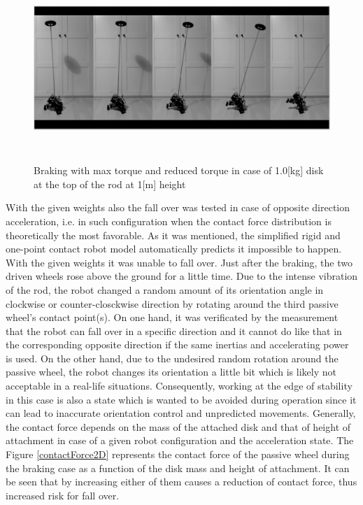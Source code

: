 \documentclass[12pt,english]{article}
\begin{document}
\begin{figure}[htb!]
	\centering
	\includegraphics[height=7cm]{figures/fallover_video_1kg.png}
	\caption{Braking with max torque and reduced torque in case of 1.0[kg] disk at the top of the rod at 1[m] height}
	\label{fallover_video_1kg}
\end{figure}
With the given weights also the fall over was tested in case of opposite direction acceleration, i.e. in such configuration when the contact force distribution is theoretically the most favorable. As it was mentioned, the simplified rigid and one-point contact robot model automatically predicts it impossible to happen. With the given weights it was unable to fall over. Just after the braking, the two driven wheels rose above the ground for a little time. Due to the intense vibration of the rod, the robot changed a random amount of its orientation angle in clockwise or counter-closckwise direction by rotating around the third passive wheel's contact point(s). On one hand, it was verificated by the measurement that the robot can fall over in a specific direction and it cannot do like that in the corresponding opposite direction if the same inertias and accelerating power is used. On the other hand, due to the undesired random rotation around the passive wheel, the robot changes its orientation a little bit which is likely not acceptable in a real-life situations. Consequently, working at the edge of stability in this case is also a state which is wanted to be avoided during operation since it can lead to inaccurate orientation control and unpredicted movements. Generally, the contact force depends on the mass of the attached disk and that of height of attachment in case of a given robot configuration and the acceleration state. The Figure \ref{contactForce2D} represents the contact force of the passive wheel during the braking case as a function of the disk mass and height of attachment. It can be seen that by increasing either of them causes a reduction of contact force, thus increased risk for fall over.
\end{document}
